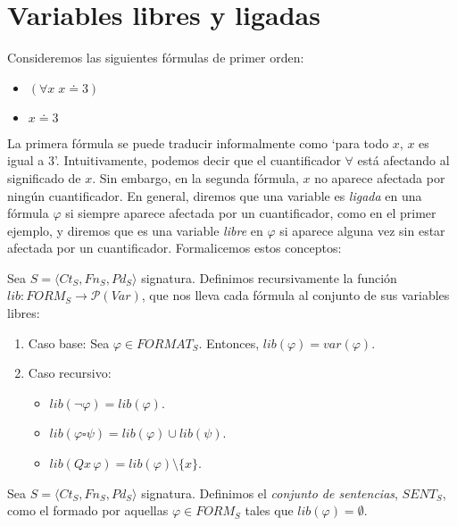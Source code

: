 \section{Variables libres y ligadas}
Consideremos las siguientes fórmulas de primer orden:
\begin{itemize}
    \item $(\forall x\;x\doteq3)$
    \item $x\doteq3$
\end{itemize}
La primera fórmula se puede traducir informalmente como `para todo $x$, $x$ es igual a 3'. Intuitivamente, podemos decir que el cuantificador $\forall$ está afectando al significado de $x$. Sin embargo, en la segunda fórmula, $x$ no aparece afectada por ningún cuantificador. En general, diremos que una variable es \textit{ligada} en una fórmula $\varphi$ si siempre aparece afectada por un cuantificador, como en el primer ejemplo, y diremos que es una variable \textit{libre} en $\varphi$ si aparece alguna vez sin estar afectada por un cuantificador. Formalicemos estos conceptos:


\begin{definition}
Sea $S = \langle Ct_{S}, Fn_{S}, Pd_{S}\rangle$ signatura. Definimos recursivamente la función $lib: FORM_S \rightarrow \mathcal{P}(Var)$, que nos lleva cada fórmula al conjunto de sus variables libres:
\begin{enumerate}
    \item Caso base: Sea $\varphi \in FORMAT_S$. Entonces, $lib(\varphi) = var(\varphi)$.
    \item Caso recursivo: 
        \begin{itemize}
            \item $lib(\neg \varphi) = lib(\varphi)$.
            \item $lib(\varphi \square \psi) = lib(\varphi) \cup lib(\psi)$.
            \item $lib(Qx \, \varphi) = lib(\varphi) \setminus \{x\}$.
        \end{itemize}
\end{enumerate}
\end{definition}

\begin{definition}
Sea $S = \langle Ct_{S}, Fn_{S}, Pd_{S}\rangle$ signatura. Definimos el \textit{conjunto de sentencias}, $SENT_S$, como el formado por aquellas $\varphi \in FORM_S$ tales que $lib(\varphi) = \emptyset$.
\end{definition}